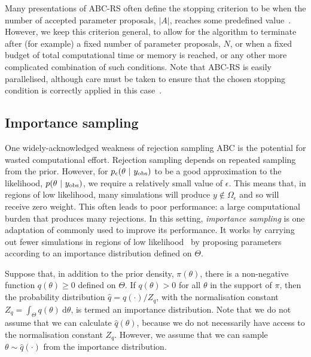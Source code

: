 \documentclass[review,demo]{siamonline190516}
\begin{document}
Many presentations of ABC-RS often define the stopping criterion to be when the number of accepted parameter proposals, $|A|$, reaches some predefined value~\cite{Beaumont2010,Sisson2018}.
However, we keep this criterion general, to allow for the algorithm to terminate after (for example) a fixed number of parameter proposals, $N$, or when a fixed budget of total computational time or memory is reached, or any other more complicated combination of such conditions.
Note that ABC-RS is easily parallelised, although care must be taken to ensure that the chosen stopping condition is correctly applied in this case~\cite{Jagiella2017}.

\subsection{Importance sampling}
\label{s:ImportanceSampling}

One widely-acknowledged weakness of rejection sampling ABC is the potential for wasted computational effort. 
Rejection sampling depends on repeated sampling from the prior. 
However, for $p_\epsilon(\theta~|~y_{\mathrm{obs}})$ to be a good approximation to the likelihood, $p(\theta~|~y_{\mathrm{obs}})$, we require a relatively small value of $\epsilon$.
This means that, in regions of low likelihood, many simulations will produce $y \notin \Omega_\epsilon$ and so will receive zero weight.
This often leads to poor performance: a large computational burden that produces many rejections.
In this setting, \emph{importance sampling} is one adaptation of  commonly used to improve its performance.
It works by carrying out fewer simulations in regions of low likelihood~\cite{Sisson2018,Owen2013} by proposing parameters according to an importance distribution defined on $\Theta$.

Suppose that, in addition to the prior density, $\pi(\theta)$, there is a non-negative function $q(\theta) \geq 0$ defined on $\Theta$.
If $q(\theta)>0$ for all $\theta$ in the support of $\pi$, then the probability distribution $\hat q = q(\cdot)/Z_q$, with the normalisation constant $Z_q = \int_\Theta q(\theta) ~\mathrm d\theta$, is termed an importance distribution.
Note that we do not assume that we can calculate $\hat q(\theta)$, because we do not necessarily have access to the normalisation constant $Z_q$.
However, we assume that we can sample $\theta \sim \hat q(\cdot)$ from the importance distribution.
\end{document}
